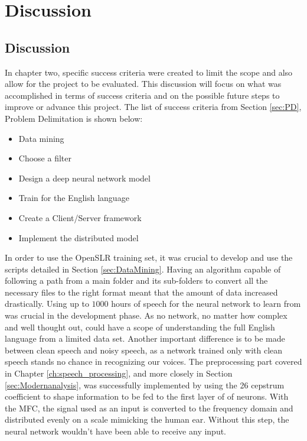 \chapter{Discussion}\label{ch:discussion}

\section{Discussion}
In chapter two, specific success criteria were created to limit the scope and also allow for the project to be evaluated. This discussion will focus on what was accomplished in terms of success criteria and on the possible future steps to improve or advance this project. The list of success criteria from Section \ref{sec:PD}, Problem Delimitation is shown below:
\begin{itemize}
    \item Data mining
    \item Choose a filter
    \item Design a deep neural network model
    \item Train for the English language
    \item Create a Client/Server framework
    \item Implement the distributed model
\end{itemize} 
In order to use the OpenSLR training set, it was crucial to develop and use the 
scripts detailed in Section \ref{sec:DataMining}.
 Having an algorithm capable of following a path from a main folder and its sub-folders to convert all the necessary files to the right format meant that the 
 amount of data increased drastically.
  Using up to $1000$ hours of speech for the neural network to learn from was 
  crucial in the development phase. 
  As no network, no matter how complex and well thought out, could have a scope of 
  understanding the full English language from a limited data set. 
  Another important difference is to be made between clean speech and noisy speech, 
  as a network trained only with clean speech stands no chance in recognizing our 
  voices. 
  The preprocessing part covered in Chapter \ref{ch:speech_processing}, and more
   closely in Section \ref{sec:Modernanalysis}, was  successfully implemented by 
   using the 26 cepstrum coefficient to shape information to be fed to the first 
   layer of of neurons. With the MFC, the signal used as an input is converted to the frequency
   domain and distributed evenly on a scale mimicking the human ear. Without this step, the neural
   network wouldn't have been able to receive any input.\\\\
